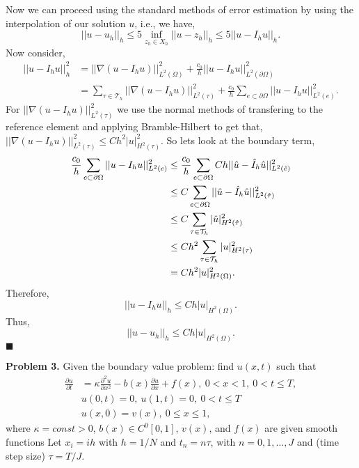\documentclass[11pt]{article}
\begin{document}
Now we can proceed using the standard methods of error estimation by using the interpolation of our solution $u$, i.e., we have,
\begin{equation*}
    ||u - u_h||_h \leq 5 \inf_{z_h \in X_h} ||u - z_h||_h \leq 5 ||u - I_h u||_h.
\end{equation*}
Now consider,
\begin{align*}
    ||u - I_h u||^2_h &= ||\nabla (u - I_h u)||^2_{L^2(\Omega)} + \frac{c_0}{h} ||u - I_h u||^2_{L^2(\partial \Omega)} \\
    &= \sum_{\tau \in \mathcal{T}_h} ||\nabla (u - I_h u)||^2_{L^2(\tau)} + \frac{c_0}{h} \sum_{e\subset \partial \Omega} ||u - I_h u||^2_{L^2(e)}.
\end{align*}
For $||\nabla (u - I_h u)||^2_{L^2(\tau)}$ we use the normal methods of transfering to the reference element and applying Bramble-Hilbert to get that, $||\nabla (u - I_h u)||^2_{L^2(\tau)} \leq Ch^2|u|_{H^2(\tau)}^2$.
So lets look at the boundary term,
\begin{align*}
    \frac{c_0}{h} \sum_{e \subset \partial \Omega} ||u - I_h u||^2_{L^2(e)} &\leq \frac{c_0}{h} \sum_{e \subset \partial \Omega} C h ||\Hat{u} - \Hat{I}_h \Hat{u}||^2_{L^2(\Hat{e})} \\
    &\leq C \sum_{e \subset \partial \Omega} ||\Hat{u} - \Hat{I}_h \Hat{u}||^2_{L^2(\Hat{\tau})} \\
    &\leq C \sum_{\tau \in \mathcal{T}_h} |\Hat{u}|^2_{H^2(\Hat{\tau})} \\
    &\leq Ch^2 \sum_{\tau \in \mathcal{T}_h} |u|^2_{H^2(\tau)} \\
    &= Ch^2 |u|^2_{H^2(\Omega)}.
\end{align*}
Therefore, 
\begin{equation*}
    ||u - I_h u||_h \leq Ch|u|_{H^2(\Omega)}.
\end{equation*}
Thus,
\begin{equation*}
    ||u - u_h||_h \leq Ch|u|_{H^2(\Omega)}.
\end{equation*}
$\blacksquare$




\vskip 2cm



\textbf{Problem 3.} Given the boundary value problem: find $u(x,t)$ such that 
\begin{align*}
\frac{\partial u}{\partial t} &= \kappa \frac{\partial^2 u}{\partial x^2} - b(x)\frac{\partial u}{\partial x} + f(x), \: 0 < x < 1, \: 0 < t \leq T, \\
&u(0,t) = 0, \: u(1,t) = 0, \: 0 < t \leq T \\
&u(x,0) = v(x), \: 0 \leq x \leq 1,
\end{align*}
where $\kappa = const > 0$, $b(x) \in C^0[0,1]$, $v(x)$, and $f(x)$ are given smooth functions Let $x_i = ih$ with $h = 1/N$ and $t_n = n\tau$, with $n = 0,1, \ldots, J$ and (time step size) $\tau = T/J$.
\\[4pt]
\end{document}
